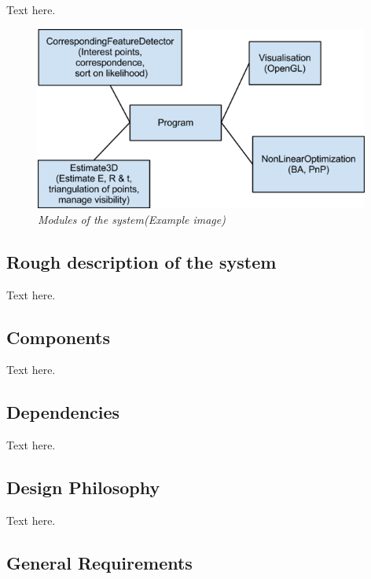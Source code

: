 Text here.

\begin{figure}[htb]
	\centering
	\includegraphics[width=110mm]{images/example2.png}
	\caption[This text ends up at the list of figures]{\textit{Modules of the system(Example image)}}
	\label{fig:block_overview2_fig}  %
\end{figure}

\subsection{Rough description of the system}
Text here.

\subsection{Components}
Text here.

\subsection{Dependencies}
Text here.

\subsection{Design Philosophy}
Text here.

\subsection{General Requirements}
\label{sec:general_req}
\reqtable
{
}